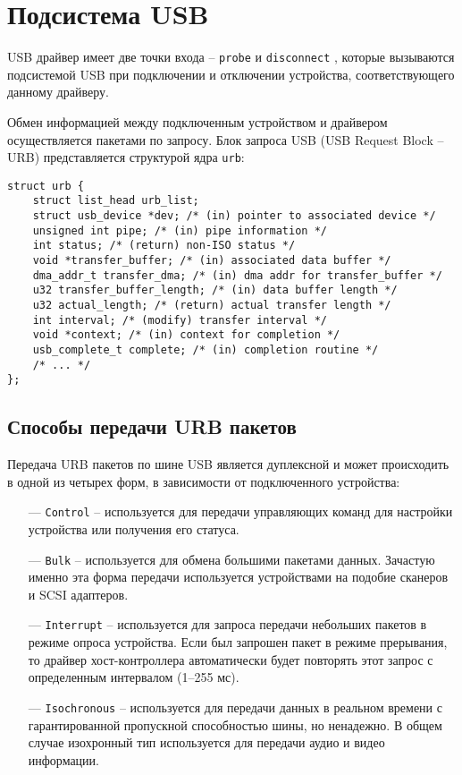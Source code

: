\section{Подсистема USB}

USB драйвер имеет две точки входа -- \texttt{probe} и \texttt{disconnect} \cite{usb-driver}, которые вызываются подсистемой USB при подключении и отключении устройства, соответствующего данному драйверу.

Обмен информацией между подключенным устройством и драйвером осуществляется пакетами по запросу. Блок запроса USB (USB Request Block -- URB) представляется структурой ядра \texttt{urb}:

\begin{small}
\begin{verbatim}
struct urb {
    struct list_head urb_list;
    struct usb_device *dev; /* (in) pointer to associated device */
    unsigned int pipe; /* (in) pipe information */
    int status; /* (return) non-ISO status */
    void *transfer_buffer; /* (in) associated data buffer */
    dma_addr_t transfer_dma; /* (in) dma addr for transfer_buffer */
    u32 transfer_buffer_length; /* (in) data buffer length */
    u32 actual_length; /* (return) actual transfer length */
    int interval; /* (modify) transfer interval */
    void *context; /* (in) context for completion */
    usb_complete_t complete; /* (in) completion routine */
    /* ... */
};
\end{verbatim}
\end{small}

\subsection{Способы передачи URB пакетов}

Передача URB пакетов по шине USB является дуплексной и может происходить в одной из четырех форм, в зависимости от подключенного устройства:

\begin{itemize}[leftmargin=1.6\parindent]
    \item[---] \texttt{Control} -- используется для передачи управляющих команд для настройки устройства или получения его статуса.
    \item[---] \texttt{Bulk} -- используется для обмена большими пакетами данных. Зачастую именно эта форма передачи используется устройствами на подобие сканеров и SCSI адаптеров.
    \item[---] \texttt{Interrupt} -- используется для запроса передачи небольших пакетов в режиме опроса устройства. Если был запрошен пакет в режиме прерывания, то драйвер хост-контроллера автоматически будет повторять этот запрос с определенным интервалом (1--255 мс).
    \item[---] \texttt{Isochronous} -- используется для передачи данных в реальном времени с гарантированной пропускной способностью шины, но ненадежно. В общем случае изохронный тип используется для передачи аудио и видео информации. 
\end{itemize}


